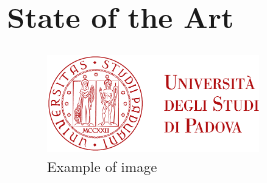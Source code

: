 
\chapter{State of the Art}
\label{chp:stateOfArt}

\begin{figure}[ht]
    \centering
    \includegraphics[width=0.5\textwidth]{res/ltunipd}
    \caption{Example of image}
\end{figure}